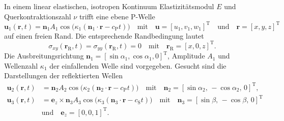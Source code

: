 



In einem linear elastischen, isotropen Kontinuum Elastizitätsmodul $E$ und Querkontraktionszahl $\nu$ trifft eine ebene P-Welle
\begin{equation*}
    \mathbf{u}_1(\mathbf{r},t)=\mathbf{n}_1 A_1 \cos\bigl(\kappa_1 (\mathbf{n}_1\cdot \mathbf{r}-c_\mathrm{P}t)\bigr) 
    \quad \text{mit} \quad
    \mathbf{u}={[u_1,v_1,w_1]}^\mathrm{T}
    \quad \text{und} \quad
    \mathbf{r}={[x,y,z]}^\mathrm{T}
\end{equation*}
auf einen freien Rand. Die entsprechende Randbedingung lautet
\begin{equation*}
    \sigma_{xy}(\mathbf{r}_\mathrm{R},t) = \sigma_{yy}(\mathbf{r}_\mathrm{R},t) = 0
    \quad \text{mit} \quad
    \mathbf{r}_\mathrm{R}={ [x,0,z] }^\mathrm{T}. 
\end{equation*}
Die Ausbreitungsrichtung $\mathbf{n}_1=[\sin\alpha_1, \cos\alpha_1, 0]^\mathrm{T}$, Amplitude $A_1$ und Wellenzahl $\kappa_1$ der einfallenden Welle sind vorgegeben.
Gesucht sind die Darstellungen der reflektierten Wellen
\begin{align*}
    \mathbf{u}_2(\mathbf{r},t) &= \mathbf{n}_2 A_2 \cos\bigl(\kappa_2 (\mathbf{n}_2\cdot \mathbf{r}-c_\mathrm{P}t)\bigr)
    \quad \text{mit} \quad
    \mathbf{n}_2=[\sin\alpha_2,\, -\cos\alpha_2,\, 0]^\mathrm{T}, \\
    \mathbf{u}_3(\mathbf{r},t) &= \mathbf{e}_z\times\mathbf{n}_3 A_3 \cos\bigl(\kappa_3 (\mathbf{n}_3\cdot \mathbf{r}-c_\mathrm{S}t)\bigr)
    \quad \text{mit} \quad 
    \mathbf{n}_3=[\sin\beta,\, -\cos\beta,\, 0]^\mathrm{T} \\
    &\text{und} \quad
    \mathbf{e}_z={[0,0,1]}^\mathrm{T}.
\end{align*}


